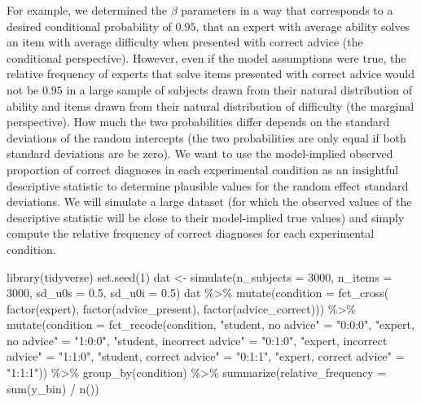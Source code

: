 \documentclass[
  man,
  floatsintext,
  longtable,
  a4paper,
  nolmodern,
  notxfonts,
  notimes,
  colorlinks=true,linkcolor=blue,citecolor=blue,urlcolor=blue]{apa7}
\newenvironment{Shaded}{\begin{snugshade}}{\end{snugshade}}
\newcommand{\AttributeTok}[1]{\textcolor[rgb]{0.40,0.45,0.13}{#1}}
\newcommand{\DecValTok}[1]{\textcolor[rgb]{0.68,0.00,0.00}{#1}}
\newcommand{\FloatTok}[1]{\textcolor[rgb]{0.68,0.00,0.00}{#1}}
\newcommand{\FunctionTok}[1]{\textcolor[rgb]{0.28,0.35,0.67}{#1}}
\newcommand{\NormalTok}[1]{\textcolor[rgb]{0.00,0.23,0.31}{#1}}
\newcommand{\OtherTok}[1]{\textcolor[rgb]{0.00,0.23,0.31}{#1}}
\newcommand{\SpecialCharTok}[1]{\textcolor[rgb]{0.37,0.37,0.37}{#1}}
\newcommand{\StringTok}[1]{\textcolor[rgb]{0.13,0.47,0.30}{#1}}
\begin{document}
For example, we determined the \(\beta\) parameters in a way that
corresponds to a desired conditional probability of \(0.95\), that an
expert with average ability solves an item with average difficulty when
presented with correct advice (the conditional perspective). However,
even if the model assumptions were true, the relative frequency of
experts that solve items presented with correct advice would not be
\(0.95\) in a large sample of subjects drawn from their natural
distribution of ability and items drawn from their natural distribution
of difficulty (the marginal perspective). How much the two probabilities
differ depends on the standard deviations of the random intercepts (the
two probabilities are only equal if both standard deviations are be
zero). We want to use the model-implied observed proportion of correct
diagnoses in each experimental condition as an insightful descriptive
statistic to determine plausible values for the random effect standard
deviations. We will simulate a large dataset (for which the observed
values of the descriptive statistic will be close to their model-implied
true values) and simply compute the relative frequency of correct
diagnoses for each experimental condition.

\begin{Shaded}
\begin{Highlighting}[]
\FunctionTok{library}\NormalTok{(tidyverse)}
\FunctionTok{set.seed}\NormalTok{(}\DecValTok{1}\NormalTok{)}
\NormalTok{dat }\OtherTok{\textless{}{-}} \FunctionTok{simulate}\NormalTok{(}\AttributeTok{n\_subjects =} \DecValTok{3000}\NormalTok{, }\AttributeTok{n\_items =} \DecValTok{3000}\NormalTok{,}
  \AttributeTok{sd\_u0s =} \FloatTok{0.5}\NormalTok{, }\AttributeTok{sd\_u0i =} \FloatTok{0.5}\NormalTok{)}
\NormalTok{dat }\SpecialCharTok{\%\textgreater{}\%} 
  \FunctionTok{mutate}\NormalTok{(}\AttributeTok{condition =} \FunctionTok{fct\_cross}\NormalTok{(}
    \FunctionTok{factor}\NormalTok{(expert), }\FunctionTok{factor}\NormalTok{(advice\_present), }\FunctionTok{factor}\NormalTok{(advice\_correct))) }\SpecialCharTok{\%\textgreater{}\%}
  \FunctionTok{mutate}\NormalTok{(}\AttributeTok{condition =} \FunctionTok{fct\_recode}\NormalTok{(condition,}
 \StringTok{"student, no advice"} \OtherTok{=} \StringTok{"0:0:0"}\NormalTok{, }\StringTok{"expert, no advice"} \OtherTok{=} \StringTok{"1:0:0"}\NormalTok{, }
 \StringTok{"student, incorrect advice"} \OtherTok{=} \StringTok{"0:1:0"}\NormalTok{, }\StringTok{"expert, incorrect advice"} \OtherTok{=} \StringTok{"1:1:0"}\NormalTok{,}
 \StringTok{"student, correct advice"} \OtherTok{=} \StringTok{"0:1:1"}\NormalTok{, }\StringTok{"expert, correct advice"} \OtherTok{=} \StringTok{"1:1:1"}\NormalTok{)) }\SpecialCharTok{\%\textgreater{}\%} 
  \FunctionTok{group\_by}\NormalTok{(condition) }\SpecialCharTok{\%\textgreater{}\%}
  \FunctionTok{summarize}\NormalTok{(}\AttributeTok{relative\_frequency =} \FunctionTok{sum}\NormalTok{(y\_bin) }\SpecialCharTok{/} \FunctionTok{n}\NormalTok{())}
\end{Highlighting}
\end{Shaded}
\end{document}
